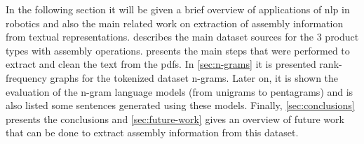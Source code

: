 In the following section it will be given a brief overview of applications of \gls{nlp} in robotics and also the main related work on extraction of assembly information from textual representations.  describes the main dataset sources for the 3 product types with assembly operations.  presents the main steps that were performed to extract and clean the text from the \glspl{pdf}. In \cref{sec:n-grams} it is presented rank-frequency graphs for the tokenized dataset n-grams. Later on, it is shown the evaluation of the n-gram language models (from unigrams to pentagrams) and is also listed some sentences generated using these models. Finally, \cref{sec:conclusions} presents the conclusions and \cref{sec:future-work} gives an overview of future work that can be done to extract assembly information from this dataset.
